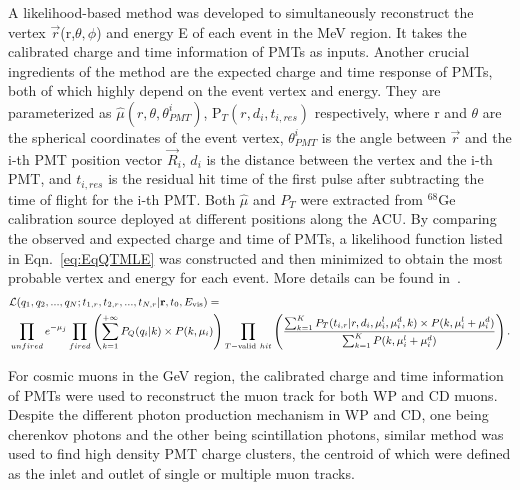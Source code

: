 A likelihood-based method was developed to simultaneously reconstruct the vertex $\Vec{r}$(r,$\theta,\phi$) and energy E of each event in the MeV region. It takes the calibrated charge and time information of PMTs as inputs. 
Another crucial ingredients of the method are the expected charge and time response of PMTs, both of which  highly depend on the event vertex and energy. They are parameterized as $\hat{\mu}(r, \theta, \theta^i_{PMT})$, P$_T(r, d_i, t_{i,res})$ respectively, where r and $\theta$ are the spherical coordinates of the event vertex, $\theta^i_{PMT}$ is the angle between $\Vec{r}$ and the i-th PMT position vector $\Vec{R}_i$,  $d_i$ is the distance between the vertex and the i-th PMT, and $t_{i,res}$ is the residual hit time of the first pulse after subtracting the time of flight for the i-th PMT.
Both $\hat{\mu}$ and $P_T$ were extracted from $^{68}$Ge calibration source deployed at different positions along the ACU. By comparing the observed and expected charge and time of PMTs, a likelihood function listed in Eqn.~\ref{eq:EqQTMLE} was constructed and then minimized to obtain the most probable vertex and energy for each event.
More details can be found in~\cite{Huang:2022zum, JUNO:2024fdc}.
\begin{equation}\small
\label{eq:EqQTMLE}
\begin{split}
    &\mathcal{L}(q_{1},q_{2},...,q_{N}; t_{1,r},t_{2,r},...,t_{N,r}|\mathbf{r},t_0,
    E_{\textrm{vis}}) = \\
      & \prod_{unfired}e^{-\mu_{j}} \prod_{fired} \left(\sum_{k=1}^{+\infty} P_{Q}(q_{i}|k)\times P(k, \mu_i)  \right)  
      \prod_{T-\textrm{valid}~hit} \left( \frac{\sum^{K}_{k=1} P_{T}(t_{i,r}|r, d_i, \mu^{l}_i, \mu^{d}_i, k)\times P(k, \mu^{l}_i+\mu^{d}_i)} {\sum^{K}_{k=1} P(k, \mu^{l}_i+\mu^{d}_i)}\right).
\end{split}
\end{equation}

For cosmic muons in the GeV region, the calibrated charge and time information of PMTs were used to reconstruct the muon track for both WP and CD muons. Despite the different photon production mechanism in WP and CD, one being cherenkov photons and the other being scintillation photons, similar method was used to find high density PMT charge clusters, the centroid of which were defined as the inlet and outlet of single or multiple muon tracks.

